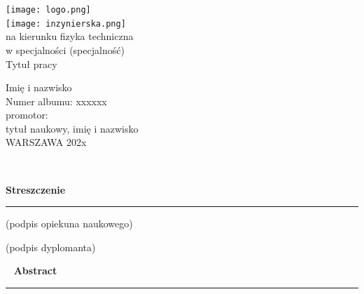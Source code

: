 \pagestyle{empty}

\begin{titlepage}
	
\begin{minipage}{\textwidth}
	\begin{center}
		\texttt{[image: logo.png]} \\
			\vspace{3cm}
		\texttt{[image: inzynierska.png]} \\ %
			\vspace{1.5cm}
  			na kierunku fizyka techniczna \\
			w specjalności (specjalność) \\
			\vspace{2cm}	
		{\Large
			Tytuł pracy}

			\vspace{2cm}	
		{\huge
			Imię i nazwisko} \\
			Numer albumu: xxxxxx \\
			\vspace{1.5cm}	
			promotor: \\
			tytuł naukowy, imię i nazwisko \\
			\vspace{3cm}
			WARSZAWA 202x		
	\end{center}
\end{minipage}

\end{titlepage}

\newpage
\mbox{ }

\newpage
{\large \textbf{Streszczenie}}\\
{\color{sliwka}\rule[1pt]{\textwidth}{1.5pt}}




\vspace{2cm}

\begin{multicols}{2}
	\begin{flushleft}
		(podpis opiekuna naukowego)
	\end{flushleft}
	\begin{flushright}
		(podpis dyplomanta)
	\end{flushright}
\end{multicols}

\newpage
\mbox{ }
\newpage
{\large \textbf{Abstract}}\\
{\color{sliwka}\rule[1pt]{\textwidth}{1.5pt}}


